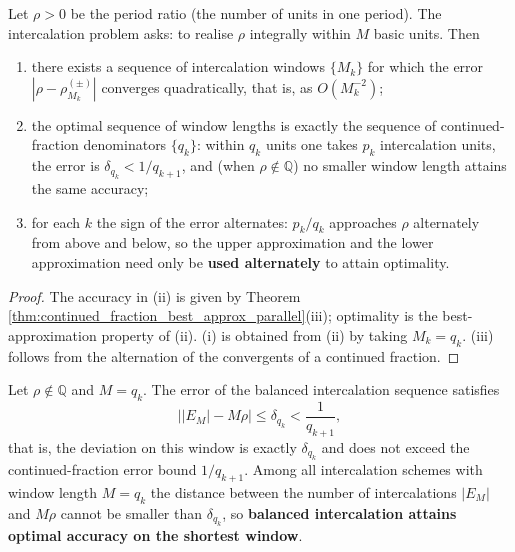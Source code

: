 \begin{theorem}\label{thm:best_intercalation_parallel}
Let $\rho>0$ be the period ratio (the number of units in one period). The intercalation problem asks: to realise $\rho$ integrally within $M$ basic units. Then
\begin{enumerate}[label=(\roman*)]
    \item there exists a sequence of intercalation windows $\{M_k\}$ for which the error $|\rho-\rho^{(\pm)}_{M_k}|$ converges quadratically, that is, as $O(M_k^{-2})$;
    \item the optimal sequence of window lengths is exactly the sequence of continued-fraction denominators $\{q_k\}$: within $q_k$ units one takes $p_k$ intercalation units, the error is $\delta_{q_k}<1/q_{k+1}$, and (when $\rho\notin\mathbb{Q}$) no smaller window length attains the same accuracy;
    \item for each $k$ the sign of the error alternates: $p_k/q_k$ approaches $\rho$ alternately from above and below, so the upper approximation and the lower approximation need only be \textbf{used alternately} to attain optimality.
\end{enumerate}
\end{theorem}

\begin{proof}
The accuracy in (ii) is given by Theorem \ref{thm:continued_fraction_best_approx_parallel}(iii); optimality is the best-approximation property of (ii). (i) is obtained from (ii) by taking $M_k=q_k$. (iii) follows from the alternation of the convergents of a continued fraction.
\end{proof}

\begin{corollary}\label{cor:balanced_intercalation_optimal}
Let $\rho\notin\mathbb{Q}$ and $M=q_k$. The error of the balanced intercalation sequence satisfies
\[
\big||E_M|-M\rho\big|\le\delta_{q_k}<\frac1{q_{k+1}},
\]
that is, the deviation on this window is exactly $\delta_{q_k}$ and does not exceed the continued-fraction error bound $1/q_{k+1}$. Among all intercalation schemes with window length $M=q_k$ the distance between the number of intercalations $|E_M|$ and $M\rho$ cannot be smaller than $\delta_{q_k}$, so \textbf{balanced intercalation attains optimal accuracy on the shortest window}.
\end{corollary}

